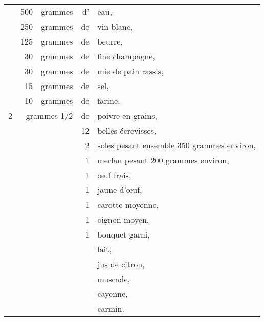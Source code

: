 \footnotesize
\begin{longtable}{rrrrp{16em}}
  &     500 & grammes     & d' & eau,                                                                     \\
  &     250 & grammes     & de & vin blanc,                                                               \\
  &     125 & grammes     & de & beurre,                                                                  \\
  &      30 & grammes     & de & fine champagne,                                                          \\
  &      30 & grammes     & de & mie de pain rassis,                                                      \\
  &      15 & grammes     & de & sel,                                                                     \\
  &      10 & grammes     & de & farine,                                                                  \\
2 & \multicolumn{2}{r}{grammes 1/2}   & de & poivre en grains,                                            \\
  &         &             & 12 & belles écrevisses,                                                       \\
  &         &             &  2 & soles pesant ensemble 350 grammes environ,                               \\
  &         &             &  1 & merlan pesant 200 grammes environ,                                       \\
  &         &             &  1 & œuf frais,                                                               \\
  &         &             &  1 & jaune d'œuf,                                                             \\
  &         &             &  1 & carotte moyenne,                                                         \\
  &         &             &  1 & oignon moyen,                                                            \\
  &         &             &  1 & bouquet garni,                                                           \\
  &         &             &    & lait,                                                                    \\
  &         &             &    & jus de citron,                                                           \\
  &         &             &    & muscade,                                                                 \\
  &         &             &    & cayenne,                                                                 \\
  &         &             &    & carmin.                                                                  \\
\end{longtable}
\normalsize

